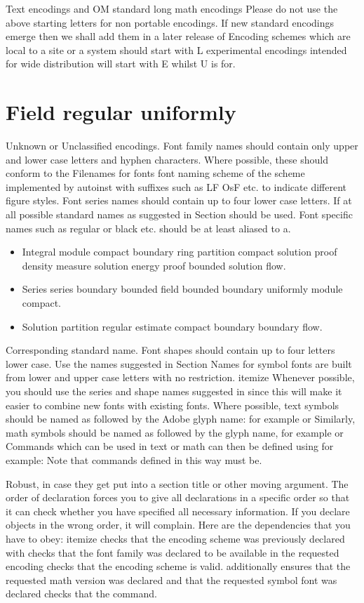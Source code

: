 \documentclass{article}
\begin{document}
Text encodings and OM standard long math encodings Please do not use the above starting letters for non portable encodings. If new standard encodings emerge then we shall add them in a later release of Encoding schemes which are local to a site or a system should start with L experimental encodings intended for wide distribution will start with E whilst U is for.

\section{Field regular uniformly}\label{sec20}
Unknown or Unclassified encodings. Font family names should contain only upper and lower case letters and hyphen characters. Where possible, these should conform to the Filenames for fonts font naming scheme of the scheme implemented by autoinst with suffixes such as LF OsF etc. to indicate different figure styles. Font series names should contain up to four lower case letters. If at all possible standard names as suggested in Section should be used. Font specific names such as regular or black etc. should be at least aliased to a.
\begin{itemize}
\item Integral module compact boundary ring partition compact solution proof density measure solution energy proof bounded solution flow.
\item Series series boundary bounded field bounded boundary uniformly module compact.
\item Solution partition regular estimate compact boundary boundary flow.
\end{itemize}

Corresponding standard name. Font shapes should contain up to four letters lower case. Use the names suggested in Section Names for symbol fonts are built from lower and upper case letters with no restriction. itemize Whenever possible, you should use the series and shape names suggested in since this will make it easier to combine new fonts with existing fonts. Where possible, text symbols should be named as followed by the Adobe glyph name: for example or Similarly, math symbols should be named as followed by the glyph name, for example or Commands which can be used in text or math can then be defined using for example: Note that commands defined in this way must be.

Robust, in case they get put into a section title or other moving argument. The order of declaration forces you to give all declarations in a specific order so that it can check whether you have specified all necessary information. If you declare objects in the wrong order, it will complain. Here are the dependencies that you have to obey: itemize checks that the encoding scheme was previously declared with checks that the font family was declared to be available in the requested encoding checks that the encoding scheme is valid. additionally ensures that the requested math version was declared and that the requested symbol font was declared checks that the command.
\end{document}
